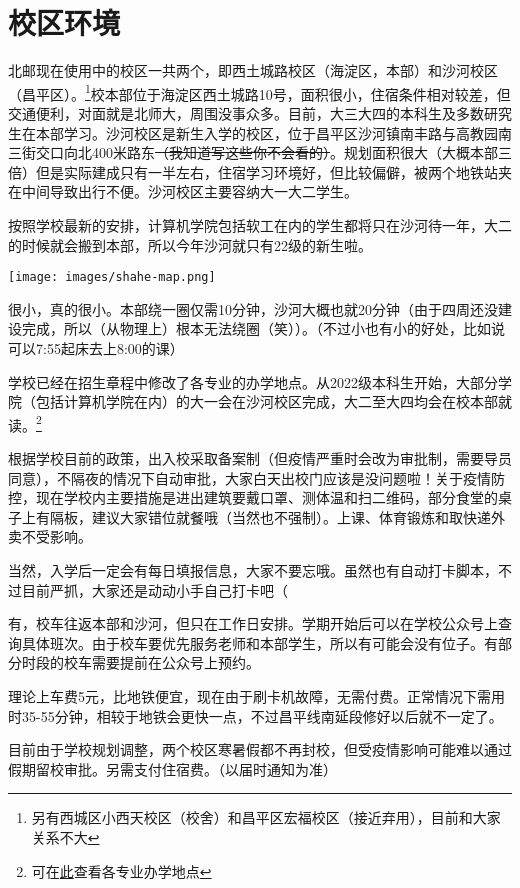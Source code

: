 \section{校区环境}

北邮现在使用中的校区一共两个，即西土城路校区（海淀区，本部）和沙河校区（昌平区）。\footnote{另有西城区小西天校区（校舍）和昌平区宏福校区（接近弃用），目前和大家关系不大}校本部位于海淀区西土城路10号，面积很小，住宿条件相对较差，但交通便利，对面就是北师大，周围没事众多。目前，大三大四的本科生及多数研究生在本部学习。沙河校区是新生入学的校区，位于昌平区沙河镇南丰路{\small{}与高教园南三街交口向北400米路东\sout{（我知道写这些你不会看的）}}。规划面积很大（大概本部三倍）但是实际建成只有一半左右，住宿学习环境好，但比较偏僻，被两个地铁站夹在中间导致出行不便。沙河校区主要容纳大一大二学生。

按照学校最新的安排，计算机学院包括软工在内的学生都将只在沙河待一年，大二的时候就会搬到本部，所以今年沙河就只有22级的新生啦。

\begin{center}
    \texttt{[image: images/shahe-map.png]}
\end{center}


很小，真的很小。本部绕一圈仅需10分钟，沙河大概也就20分钟（由于四周还没建设完成，所以（从物理上）根本无法绕圈（笑））。{\small （不过小也有小的好处，比如说可以7:55起床去上8:00的课）}


学校已经在招生章程中修改了各专业的办学地点。从2022级本科生开始，大部分学院（包括计算机学院在内）的大一会在沙河校区完成，大二至大四均会在校本部就读。\footnote{可在\href{https://zsb.bupt.edu.cn/info/1005/1720.htm}{此}查看各专业办学地点}


根据学校目前的政策，出入校采取备案制（但疫情严重时会改为审批制，需要导员同意），不隔夜的情况下自动审批，大家白天出校门应该是没问题啦！关于疫情防控，现在学校内主要措施是进出建筑要戴口罩、测体温和扫二维码，部分食堂的桌子上有隔板，建议大家错位就餐哦（当然也不强制）。上课、体育锻炼和取快递外卖不受影响。

当然，入学后一定会有每日填报信息，大家不要忘哦。虽然也有自动打卡脚本，不过目前严抓，大家还是动动小手自己打卡吧（


有，校车往返本部和沙河，但只在工作日安排。学期开始后可以在学校公众号上查询具体班次。由于校车要优先服务老师和本部学生，所以有可能会没有位子。有部分时段的校车需要提前在公众号上预约。

理论上车费5元，比地铁便宜，现在由于刷卡机故障，无需付费。正常情况下需用时35-55分钟，相较于地铁会更快一点，不过昌平线南延段修好以后就不一定了。


目前由于学校规划调整，两个校区寒暑假都不再封校，但受疫情影响可能难以通过假期留校审批。另需支付住宿费。（以届时通知为准）

